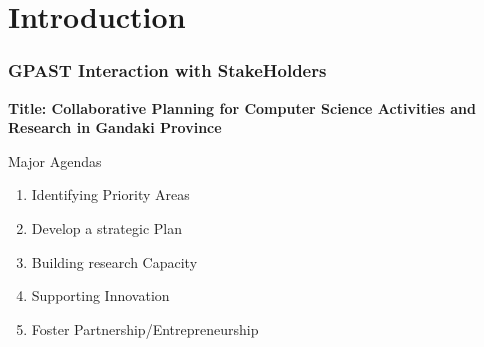 \section{Introduction}
\begin{frame}
    \frametitle{GPAST Interaction with StakeHolders}
    \textbf{Title: Collaborative Planning for Computer Science Activities and Research in Gandaki Province}
    \newline \\
    \begin{block}{Major Agendas}
        \begin{enumerate}
        \item Identifying Priority Areas
        \item Develop a strategic Plan
        \item Building research Capacity
        \item Supporting Innovation
        \item Foster Partnership/Entrepreneurship
    \end{enumerate}
    \end{block}
\end{frame}

